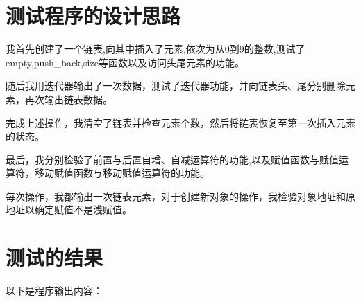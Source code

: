 \documentclass[UTF8]{ctexart}
\begin{document}
\pagestyle{fancy}
\fancyhead{}

\section{测试程序的设计思路}

我首先创建了一个链表,向其中插入了元素,依次为从0到9的整数,测试了empty,push\_back,size等函数以及访问头尾元素的功能。\par
随后我用迭代器输出了一次数据，测试了迭代器功能，并向链表头、尾分别删除元素，再次输出链表数据。\par
完成上述操作，我清空了链表并检查元素个数，然后将链表恢复至第一次插入元素的状态。\par
最后，我分别检验了前置与后置自增、自减运算符的功能,以及赋值函数与赋值运算符，移动赋值函数与移动赋值运算符的功能。\par
每次操作，我都输出一次链表元素，对于创建新对象的操作，我检验对象地址和原地址以确定赋值不是浅赋值。\par
\section{测试的结果}
以下是程序输出内容：\\
\end{document}
